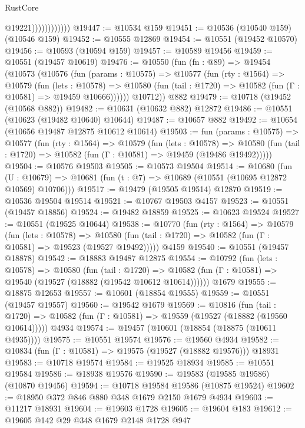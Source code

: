 \begin{lexlean}{RustCore}
\begin{coremodule}
                            @19221))))))))))))
@19447 := @10534 @159
@19451 := @10536 (@10540 @159) (@10546 @159)
@19452 := @10555 @12869
@19454 := @10551 (@19452 @10570)
@19456 := @10593 (@10594 @159)
@19457 := @10589 @19456
@19459 := @10551 (@19457 @10619)
@19476 := @10550
    (fun (fn : @89) =>
    @19454
      (@10573
        (@10576
          (fun (params : @10575) =>
          @10577
            (fun (rty : @1564) =>
            @10579
              (fun (lets : @10578) =>
              @10580 (fun (tail : @1720) => @10582 (fun (Γ : @10581) => @19459 @10666))))))
        @10712))
    @882
@19479 := @10718 (@19452 (@10568 @882))
@19482 := @10631 (@10632 @882) @12872
@19486 := @10551 (@10623 (@19482 @10640) @10644)
@19487 := @10657 @882
@19492 := @10654 (@10656 @19487 @12875 @10612 @10614)
@19503 := fun (params : @10575) =>
  @10577
    (fun (rty : @1564) =>
    @10579
      (fun (lets : @10578) =>
      @10580 (fun (tail : @1720) => @10582 (fun (Γ : @10581) => @19459 (@19486 @19492)))))
@19504 := @10576 @19503
@19505 := @10573 @19504
@19514 := @10680
    (fun (U : @10679) => @10681 (fun (t : @7) => @10689 (@10551 (@10695 @12872 @10569) @10706)))
@19517 := @19479 (@19505 @19514) @12870
@19519 := @10536 @19504 @19514
@19521 := @10767 @19503 @4157
@19523 := @10551 (@19457 @18856)
@19524 := @19482 @18859
@19525 := @10623 @19524
@19527 := @10551 (@19525 @10644)
@19538 := @10770
    (fun (rty : @1564) =>
    @10579
      (fun (lets : @10578) =>
      @10580 (fun (tail : @1720) => @10582 (fun (Γ : @10581) => @19523 (@19527 @19492)))))
    @4159
@19540 := @10551 (@19457 @18878)
@19542 := @18883 @19487 @12875
@19554 := @10792
    (fun (lets : @10578) =>
    @10580
      (fun (tail : @1720) =>
      @10582 (fun (Γ : @10581) => @19540 (@19527 (@18882 (@19542 @10612 @10614))))))
    @1679
@19555 := @18875 @12653
@19557 := @10601 (@18854 @19555)
@19559 := @10551 (@19457 @19557)
@19560 := @19542 @1679
@19569 := @10816
    (fun (tail : @1720) => @10582 (fun (Γ : @10581) => @19559 (@19527 (@18882 (@19560 @10614)))))
    @4934
@19574 := @19457 (@10601 (@18854 (@18875 (@10611 @4935))))
@19575 := @10551 @19574
@19576 := @19560 @4934
@19582 := @10834 (fun (Γ : @10581) => @19575 (@19527 (@18882 @19576))) @18931
@19583 := @10718 @19574
@19584 := @19525 @18934
@19585 := @10551 @19584
@19586 := @18938 @19576
@19590 := @19583 (@19585 @19586) (@10870 @19456)
@19594 := @10718 @19584 @19586 (@10875 @19524)
@19602 := @18950 @372 @846 @880 @348 @1679 @2150 @1679 @4934
@19603 := @11217 @18931
@19604 := @19603 @1728
@19605 := @19604 @183
@19612 := @19605 @142 @29 @348 @1679 @2148 @1728 @947

\end{coremodule}
\end{lexlean}
